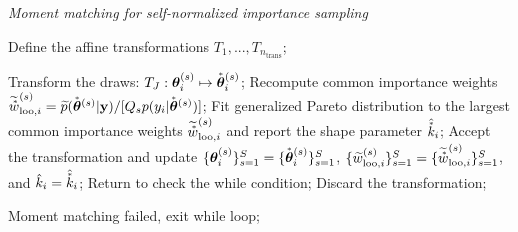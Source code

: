\documentclass[12pt]{article}
\newcommand{\transf}{\accentset{\ast}}
\begin{document}
\begin{algorithm*}[htb]
	\caption{\em Moment matching for self-normalized importance sampling}\label{alg:mm-psis}
	\begin{algorithmic}[1]
	\STATE Define the affine transformations $T_1 , ... , T_{n_{\text{trans}}}$;
		
		\STATE Transform the draws: $T_J: \boldsymbol{\theta}_i^{(s)} \mapsto \transf{\boldsymbol{\theta}}_i^{(s)}$;
		\STATE Recompute common importance weights $\widetilde{\transf{w}}_{\text{loo},i}^{(s)} = \widetilde{p} (\transf{\boldsymbol{\theta}}^{(s)}|\mathbf{y})/[Q_s p(y_{i}|\transf{\boldsymbol{\theta}}^{(s)})]$;
		\STATE Fit generalized Pareto distribution to the largest common importance weights $\widetilde{\transf{w}}_{\text{loo},i}^{(s)}$ and report the shape parameter $\hat{\transf{k}}_i$;
		\IF{$\hat{\transf{k}}_i < \hat{k}_i$}
		\STATE Accept the transformation and update $\{ \boldsymbol{\theta}_i^{(s)} \}_{s = 1}^S = \{ \transf{\boldsymbol{\theta}}_i^{(s)} \}_{s = 1}^S$, $\{ \widetilde{w}_{\text{loo},i}^{(s)} \}_{s = 1}^S = \{ \widetilde{\transf{w}}_{\text{loo},i}^{(s)} \}_{s = 1}^S$, and $\hat{k}_i = \hat{\transf{k}}_i$;
		\STATE Return to check the while condition;
		\ELSE
		\STATE Discard the transformation;
		\ENDIF
		
		
		\ENDFOR
		
		\STATE Moment matching failed, exit while loop;
		\ENDIF
		
		\ENDWHILE
		 
	\end{algorithmic}
\end{algorithm*}
\end{document}
